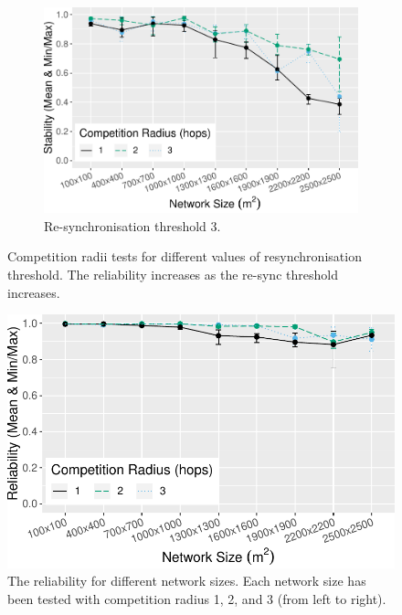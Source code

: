 \begin{figure}[bt]
\begin{subfigure}{\textwidth}
    \includegraphics[width=\textwidth, keepaspectratio]{figure/Results/ParameterEvaluation/ResyncThreshold3_Stability.pdf}
    \caption{Re-synchronisation threshold 3.}
    \label{subfig:stability-resync-treshold-3}
\end{subfigure}

    \caption{Competition radii tests for different values of resynchronisation threshold. The reliability increases as the re-sync threshold increases.}
    \label{fig:stability-resync-treshold-tests}
\end{figure}

\begin{figure}[bt]
    \centering
    \includegraphics[width=\textwidth, keepaspectratio]{figure/Results/ParameterEvaluation/CompetitionRadius_Reliability.pdf}
    \caption{The reliability for different network sizes. Each network size has been tested with competition radius 1, 2, and 3 (from left to right).}
    \label{fig:comp-radius-reliability}
\end{figure}

